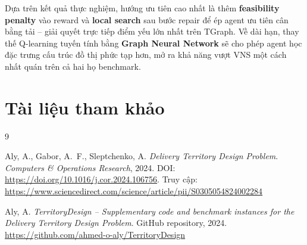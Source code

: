 \documentclass[12pt, a4paper]{article}
\begin{document}
Dựa trên kết quả thực nghiệm, hướng ưu tiên cao nhất là thêm \textbf{feasibility
penalty} vào reward và \textbf{local search} sau bước repair để ép agent ưu tiên
cân bằng tải -- giải quyết trực tiếp điểm yếu lớn nhất trên TGraph.
Về dài hạn, thay thế Q-learning tuyến tính bằng \textbf{Graph Neural Network}
sẽ cho phép agent học đặc trưng cấu trúc đồ thị phức tạp hơn, mở ra khả năng
vượt VNS một cách nhất quán trên cả hai họ benchmark.

\newpage
\section*{Tài liệu tham khảo}

\begin{thebibliography}{9}

Aly, A., Gabor, A.~F., Sleptchenko, A.
\textit{Delivery Territory Design Problem}.
\textit{Computers \& Operations Research}, 2024.
DOI: \url{https://doi.org/10.1016/j.cor.2024.106756}.
Truy cập: \url{https://www.sciencedirect.com/science/article/pii/S0305054824002284}

Aly, A.
\textit{TerritoryDesign -- Supplementary code and benchmark instances for the Delivery Territory Design Problem}.
GitHub repository, 2024.
\url{https://github.com/ahmed-o-aly/TerritoryDesign}

\end{thebibliography}
\end{document}
